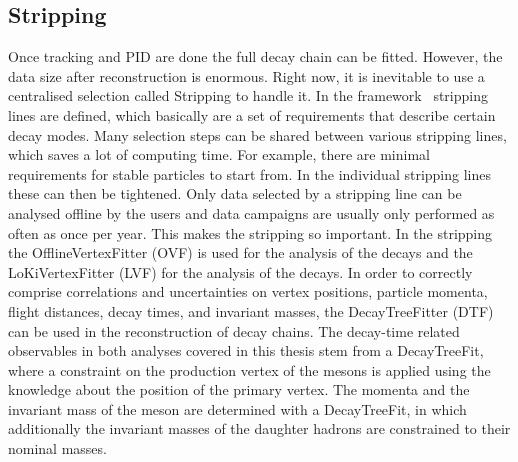 
\subsection{Stripping}
\label{sec:detector:software:stripping}

Once tracking and PID are done the full decay chain can be fitted. However,
the data size after reconstruction is enormous. Right now, it is inevitable to
use a centralised selection called Stripping to handle it. In the \davinci
framework~\cite{DaVinci} stripping lines are defined, which basically are a
set of requirements that describe certain decay modes. Many selection steps
can be shared between various stripping lines, which saves a lot of computing
time. For example, there are minimal requirements for stable particles to
start from. In the individual stripping lines these can then be tightened.
Only data selected by a stripping line can be analysed offline by the users
and data campaigns are usually only performed as often as once per year. This
makes the stripping so important. In the stripping the OfflineVertexFitter
(OVF) is used for the analysis of the \BdToJPsiKS decays and the
LoKiVertexFitter (LVF) for the analysis of the \BdToDD decays. In order to
correctly comprise correlations and uncertainties on vertex positions,
particle momenta, flight distances, decay times, and invariant masses, the
\mbox{DecayTreeFitter} (DTF)~\cite{Hulsbergen:2005pu} can be used in the
reconstruction of decay chains. The decay-time related observables in both
analyses covered in this thesis stem from a DecayTreeFit, where a constraint on the
production vertex of the \Bd mesons is applied using the knowledge about the
position of the primary vertex. The momenta and the invariant mass of the \Bd
meson are determined with a DecayTreeFit, in which additionally the invariant masses
of the daughter hadrons are constrained to their nominal masses.